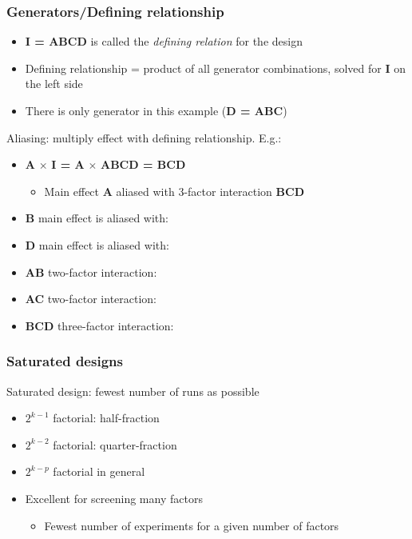 \begin{frame}\frametitle{Generators/Defining relationship}
	\begin{itemize}
		\item	\textbf{I = ABCD} is called the \emph{defining relation} for the design
		\item	Defining relationship = product of all generator combinations, solved for \textbf{I} on the left side
		\item	There is only generator in this example (\textbf{D = ABC})
	\end{itemize}

	Aliasing: multiply effect with defining relationship. E.g.:
	\begin{itemize}
		\item	\textbf{A} $\times$ \textbf{I = A} $\times$ \textbf{ABCD = BCD}
		\begin{itemize}
			\item	Main effect \textbf{A} aliased with 3-factor interaction \textbf{BCD}
		\end{itemize}
		\item	\textbf{B} main effect is aliased with:
		\item	\textbf{D} main effect is aliased with:
		\item	\textbf{AB} two-factor interaction:
		\item	\textbf{AC} two-factor interaction:
		\item	\textbf{BCD} three-factor interaction:
	\end{itemize}
\end{frame}

\begin{frame}\frametitle{Saturated designs}

	Saturated design: fewest number of runs as possible
	\begin{itemize}
		\item	$2^{k-1}$ factorial: half-fraction
		\item	$2^{k-2}$ factorial: quarter-fraction
		\item	$2^{k-p}$ factorial in general
	\end{itemize}
	\begin{itemize}
		\item	Excellent for screening many factors
		\begin{itemize}
			\item	Fewest number of experiments for a given number of factors
		\end{itemize}
	\end{itemize}
\end{frame}

